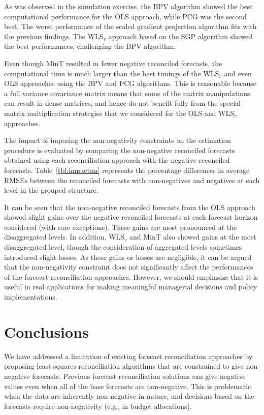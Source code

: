 \documentclass[11pt]{article}
\newcommand{\0}{\phantom{0}}
\begin{document}
As was observed in the simulation exercise, the BPV algorithm showed the best computational performance for the OLS approach, while PCG was the second best. The worst performance of the scaled gradient projection algorithm fits with the previous findings. The WLS$_{v}$ approach based on the SGP algorithm showed the best performances, challenging the BPV algorithm.

Even though MinT resulted in fewer negative reconciled forecasts, the computational time is much larger than the best timings of the WLS$_{v}$ and even OLS approaches using the BPV and PCG algorithms. This is reasonable because a full variance covariance matrix means that some of the matrix manipulations can result in dense matrices, and hence do not benefit fully from the special matrix multiplication strategies that we considered for the OLS and WLS$_{v}$ approaches.

The impact of imposing the non-negativity constraints on the estimation procedure is evaluated by comparing the non-negative reconciled forecasts obtained using each reconciliation approach with the negative reconciled forecasts. Table~\ref{tbl:impactnn} represents the percentage differences in average RMSEs between the reconciled forecasts with non-negatives and negatives at each level in the grouped structure.

It can be seen that the non-negative reconciled forecasts from the OLS approach showed slight gains over the negative reconciled forecasts at each forecast horizon considered (with rare exceptions). These gains are most pronounced at the disaggregated levels. In addition, WLS$_{v}$ and MinT also showed gains at the most disaggregated level, though the consideration of aggregated levels sometimes introduced slight losses. As these gains or losses are negligible, it can be argued that the non-negativity constraint does not significantly affect the performances of the forecast reconciliation approaches. However, we should emphasize that it is useful in real applications for making meaningful managerial decisions and policy implementations.

\section{Conclusions}

We have addressed a limitation of existing forecast reconciliation approaches by proposing least squares reconciliation algorithms that are constrained to give non-negative forecasts. Previous forecast reconciliation solutions can give negative values even when all of the base forecasts are non-negative. This is problematic when the data are inherently non-negative in nature, and decisions based on the forecasts require non-negativity (e.g., in budget allocations).
\end{document}
